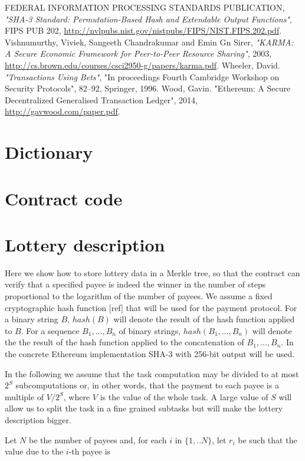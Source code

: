 \documentclass[a4paper]{article}
\begin{document}
\begin{thebibliography}{9}
 FEDERAL INFORMATION PROCESSING STANDARDS PUBLICATION,
    \textit{"SHA-3 Standard: Permutation-Based Hash and Extendable Output Functions"}, FIPS PUB 202,
    \url{http://nvlpubs.nist.gov/nistpubs/FIPS/NIST.FIPS.202.pdf}.
 Vishnumurthy, Viviek, Sangeeth Chandrakumar and Emin Gn Sirer, \textit{"KARMA: A Secure
    Economic Framework for Peer-to-Peer Resource Sharing"}, 2003,
   \url{http://cs.brown.edu/courses/csci2950-g/papers/karma.pdf}.
 Wheeler, David. \textit{"Transactions Using Bets"},
    "In proceedings Fourth Cambridge Workshop on Security Protocols", 82--92, Springer, 1996.
 Wood, Gavin. "Ethereum: A Secure Decentralized Generalised Transaction Ledger", 2014,
    \url{http://gavwood.com/paper.pdf}.
\end{thebibliography}
\appendix
\section{Dictionary}
\section{Contract code}
\section{Lottery description}
\label{sec:lottery-description}
    Here we show how to store lottery data in a Merkle tree, so that the contract can verify that a specified payee
    is indeed the winner in the number of steps proportional to the logarithm of the number of payees.
    We assume a fixed cryptographic hash function [ref] that will be used for the payment protocol.
    For a binary string $B$, $hash(B)$ will denote the result of the hash function applied to $B$.
    For a sequence $B_1, ..., B_n$ of binary strings, $hash(B_1, ..., B_n)$ will denote the the result of
    the hash function applied to the concatenation of $B_1, ..., B_n$. In the concrete Ethereum implementation SHA-3
    with 256-bit output will be used.

    In the following we assume that the task computation may be divided to at most $2^S$ subcomputations or,
    in other words, that the payment to each payee is a multiple of $V/2^S$, where $V$ is the value of the whole task.
    A large value of $S$ will allow us to split the task in a fine grained subtasks but will make the lottery
    description bigger.

    Let $N$ be the number of payees and, for each $i$ in $\{1, .. N\}$, let $r_i$ be such that the value due to
    the $i$-th payee is
\end{document}
